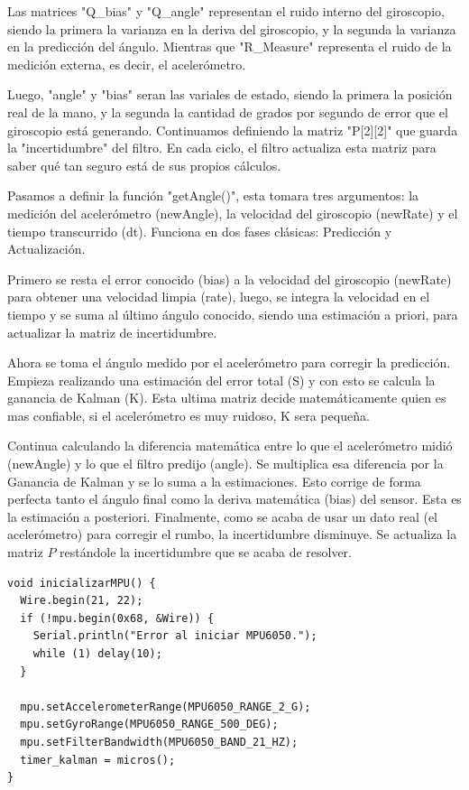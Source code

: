 \documentclass[10pt]{article}
\begin{document}
Las matrices "Q\_bias" y "Q\_angle" representan el ruido interno del giroscopio, siendo la primera la varianza en la deriva del giroscopio, y la segunda la varianza en la predicción del ángulo. Mientras que "R\_Measure" representa el ruido de la medición externa, es decir, el acelerómetro.

Luego, "angle" y "bias" seran las variales de estado, siendo la primera la posición real de la mano, y la segunda la cantidad de grados por segundo de error que el giroscopio está generando. Continuamos definiendo la matriz "P[2][2]" que guarda la "incertidumbre" del filtro. En cada ciclo, el filtro actualiza esta matriz para saber qué tan seguro está de sus propios cálculos.

Pasamos a definir la función "getAngle()", esta tomara tres argumentos: la medición del acelerómetro (newAngle), la velocidad del giroscopio (newRate) y el tiempo transcurrido (dt). Funciona en dos fases clásicas: Predicción y Actualización.

Primero se resta el error conocido (bias) a la velocidad del giroscopio (newRate) para obtener una velocidad limpia (rate), luego, se integra la velocidad en el tiempo y se suma al último ángulo conocido, siendo una estimación a priori, para actualizar la matriz de incertidumbre. 

Ahora se toma el ángulo medido por el acelerómetro para corregir la predicción. Empieza realizando una estimación del error total (S) y con esto se calcula la ganancia de Kalman (K). Esta ultima matriz decide matemáticamente quien es mas confiable, si el acelerómetro es muy ruidoso, K sera pequeña. 

Continua calculando la diferencia matemática entre lo que el acelerómetro midió (newAngle) y lo que el filtro predijo (angle). Se multiplica esa diferencia por la Ganancia de Kalman y se lo suma a la estimaciones. Esto corrige de forma perfecta tanto el ángulo final como la deriva matemática (bias) del sensor. Esta es la estimación a posteriori. Finalmente, como se acaba de usar un dato real (el acelerómetro) para corregir el rumbo, la incertidumbre disminuye. Se actualiza la matriz $P$ restándole la incertidumbre que se acaba de resolver.

\begin{lstlisting}
void inicializarMPU() {
  Wire.begin(21, 22);
  if (!mpu.begin(0x68, &Wire)) {
    Serial.println("Error al iniciar MPU6050.");
    while (1) delay(10);
  }
  
  mpu.setAccelerometerRange(MPU6050_RANGE_2_G);
  mpu.setGyroRange(MPU6050_RANGE_500_DEG);
  mpu.setFilterBandwidth(MPU6050_BAND_21_HZ);
  timer_kalman = micros();
}
\end{lstlisting}
\end{document}
